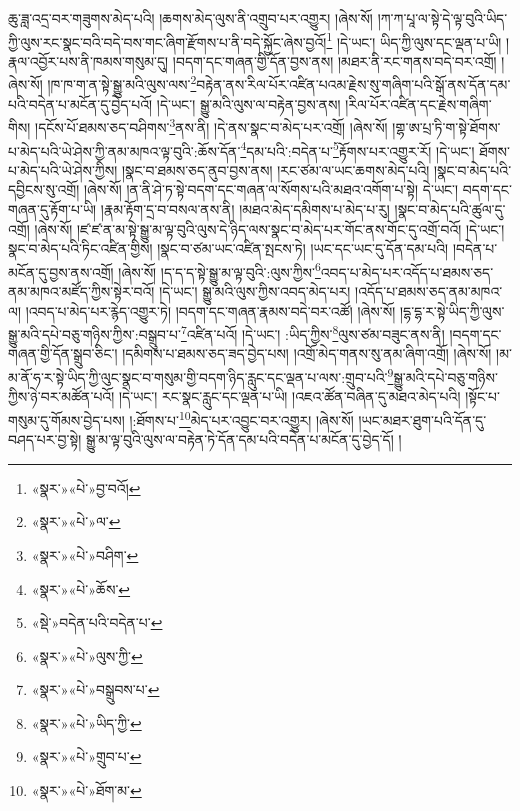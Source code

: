 ཆུ་ཟླ་འདྲ་བར་གཟུགས་མེད་པའི། །ཆགས་མེད་ལུས་ནི་འགྲུབ་པར་འགྱུར། །ཞེས་སོ། །ཀ་ཀ་པཱ་ལ་སྟེ་དེ་ལྟ་བུའི་ཡིད་ཀྱི་ལུས་རང་སྣང་བའི་བདེ་བས་གང་ཞིག་རྫོགས་པ་ནི་བདེ་སྐྱོང་ཞེས་བྱའོ།\footnote{«སྣར་»«པེ་»བྱ་བའོ།} །དེ་ཡང་། ཡིད་ཀྱི་ལུས་དང་ལྡན་པ་ཡི། །རྣལ་འབྱོར་པས་ནི་ཁམས་གསུམ་དུ། །བདག་དང་གཞན་གྱི་དོན་བྱས་ནས། །མཐར་ནི་རང་གནས་བདེ་བར་འགྲོ། །ཞེས་སོ། །ཁ་ཁ་ག་ན་སྟེ་སྒྱུ་མའི་ལུས་ལས་\footnote{«སྣར་»«པེ་»ལ་}བརྟེན་ནས་རིལ་པོར་འཛིན་པའམ་རྗེས་སུ་གཞིག་པའི་སྒོ་ནས་དོན་དམ་པའི་བདེན་པ་མངོན་དུ་བྱེད་པའོ། །དེ་ཡང་། སྒྱུ་མའི་ལུས་ལ་བརྟེན་བྱས་ནས། །རིལ་པོར་འཛིན་དང་རྗེས་གཞིག་གིས། །དངོས་པོ་ཐམས་ཅད་བཤིགས་\footnote{«སྣར་»«པེ་»བཤིག་}ནས་ནི། །དེ་ནས་སྣང་བ་མེད་པར་འགྲོ། །ཞེས་སོ། །གྷ་ཨ་པྲ་ཏི་ག་སྟེ་ཐོགས་པ་མེད་པའི་ཡེ་ཤེས་ཀྱི་ནམ་མཁའ་ལྟ་བུའི་:ཆོས་དོན་\footnote{«སྣར་»«པེ་»ཆོས་}དམ་པའི་:བདེན་པ་\footnote{«སྡེ་»བདེན་པའི་བདེན་པ་}རྟོགས་པར་འགྱུར་རོ། །དེ་ཡང་། ཐོགས་པ་མེད་པའི་ཡེ་ཤེས་ཀྱིས། །སྣང་བ་ཐམས་ཅད་ནུབ་བྱས་ནས། །རང་ཙམ་ལ་ཡང་ཆགས་མེད་པའི། །སྣང་བ་མེད་པའི་དབྱིངས་སུ་འགྲོ། །ཞེས་སོ། །ན་ནི་ཤེ་ཏ་སྟེ་བདག་དང་གཞན་ལ་སོགས་པའི་མཐའ་འགོག་པ་སྟེ། དེ་ཡང་། བདག་དང་གཞན་དུ་རྟོག་པ་ཡི། །རྣམ་རྟོག་དྲ་བ་བསལ་ནས་ནི། །མཐའ་མེད་དམིགས་པ་མེད་པ་རུ། །སྣང་བ་མེད་པའི་ཚུལ་དུ་འགྲོ། །ཞེས་སོ། །ཛ་ཛ་ན་མ་སྟེ་སྒྱུ་མ་ལྟ་བུའི་ལུས་དེ་ཉིད་ལས་སྣང་བ་མེད་པར་གོང་ནས་གོང་དུ་འགྲོ་བའོ། །དེ་ཡང་། སྣང་བ་མེད་པའི་ཏིང་འཛིན་གྱིས། །སྣང་བ་ཙམ་ཡང་འཛིན་སྤངས་ཏེ། །ཡང་དང་ཡང་དུ་དོན་དམ་པའི། །བདེན་པ་མངོན་དུ་བྱས་ནས་འགྲོ། །ཞེས་སོ། །ད་ད་ད་སྟེ་སྒྱུ་མ་ལྟ་བུའི་:ལུས་ཀྱིས་\footnote{«སྣར་»«པེ་»ལུས་ཀྱི་}འབད་པ་མེད་པར་འདོད་པ་ཐམས་ཅད་ནམ་མཁའ་མཛོད་ཀྱིས་སྟེར་བའོ། །དེ་ཡང་། སྒྱུ་མའི་ལུས་ཀྱིས་འབད་མེད་པར། །འདོད་པ་ཐམས་ཅད་ནམ་མཁའ་ལ། །འབད་པ་མེད་པར་རྙེད་འགྱུར་ཏེ། །བདག་དང་གཞན་རྣམས་བདེ་བར་འཚོ། །ཞེས་སོ། །དྷ་དྷ་ར་སྟེ་ཡིད་ཀྱི་ལུས་སྒྱུ་མའི་དཔེ་བཅུ་གཉིས་ཀྱིས་:བསྒྲུབ་པ་\footnote{«སྣར་»«པེ་»བསྒྲུབས་པ་}འཛིན་པའོ། །དེ་ཡང་། :ཡིད་ཀྱིས་\footnote{«སྣར་»«པེ་»ཡིད་ཀྱི་}ལུས་ཙམ་བཟུང་ནས་ནི། །བདག་དང་གཞན་གྱི་དོན་སྒྲུབ་ཅིང་། །དམིགས་པ་ཐམས་ཅད་ཟད་བྱེད་པས། །འགྲོ་མེད་གནས་སུ་ནམ་ཞིག་འགྲོ། །ཞེས་སོ། །མ་མ་ནོ་ཧ་ར་སྟེ་ཡིད་ཀྱི་ལུང་སྣང་བ་གསུམ་གྱི་བདག་ཉིད་རླུང་དང་ལྡན་པ་ལས་:གྲུབ་པའི་\footnote{«སྣར་»«པེ་»གྲུབ་པ་}སྒྱུ་མའི་དཔེ་བཅུ་གཉིས་ཀྱིས་ཉེ་བར་མཚོན་པའོ། །དེ་ཡང་། རང་སྣང་རླུང་དང་ལྡན་པ་ཡི། །འཇའ་ཚོན་བཞིན་དུ་མཐའ་མེད་པའི། །སྟོང་པ་གསུམ་དུ་གོམས་བྱེད་པས། །:ཐོགས་པ་\footnote{«སྣར་»«པེ་»ཐོག་མ་}མེད་པར་འབྱུང་བར་འགྱུར། །ཞེས་སོ། །ཡང་མཐར་ཐུག་པའི་དོན་དུ་བཤད་པར་བྱ་སྟེ། སྒྱུ་མ་ལྟ་བུའི་ལུས་ལ་བརྟེན་ཏེ་དོན་དམ་པའི་བདེན་པ་མངོན་དུ་བྱེད་དོ། །
